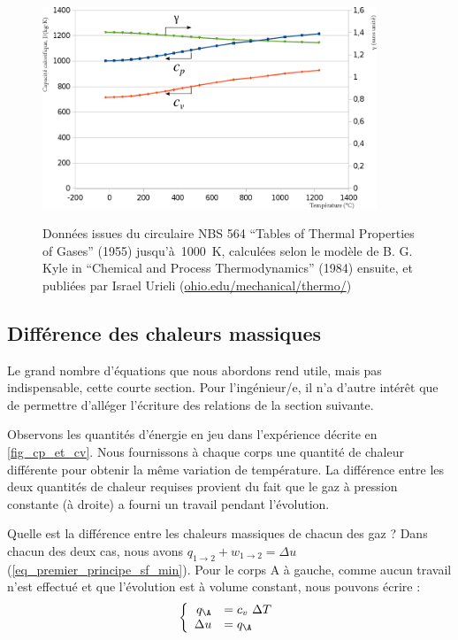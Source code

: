 		\begin{figure}[htb]
			\begin{center}
				\includegraphics[width=10cm]{images/valeurs_cp_cv_air.png}
			\end{center}
				{Données issues du circulaire NBS 564 “Tables of Thermal Properties of Gases” (1955) jusqu’à~\SI{1000}{\kelvin}, calculées selon le modèle de B. G. Kyle in “Chemical and Process Thermodynamics” (1984) ensuite, et publiées par Israel Urieli (\href{http ://www.ohio.edu/mechanical/thermo/}{ohio.edu/mechanical/thermo/})}
		\label{fig_valeurs_de_cp_cv_gamma}
		\end{figure}



	\subsection{Différence des chaleurs massiques}

		Le grand nombre d’équations que nous abordons rend utile, mais pas indispensable, cette courte section. Pour l’ingénieur/e, il n’a d’autre intérêt que de permettre d’alléger l’écriture des relations de la section suivante.

		Observons les quantités d’énergie en jeu dans l’expérience décrite en \cref{fig_cp_et_cv}. Nous fournissons à chaque corps une quantité de chaleur différente pour obtenir la même variation de température. La différence entre les deux quantités de chaleur requises provient du fait que le gaz à pression constante (à droite) a fourni un travail pendant l’évolution.

		Quelle est la différence entre les chaleurs massiques de chacun des gaz ? Dans chacun des deux cas, nous avons $q_{1 \to 2} + w_{1 \to 2} = \Delta u$ (\ref{eq_premier_principe_sf_min}). Pour le corps A à gauche, comme aucun travail n’est effectué et que l’évolution est à volume constant, nous pouvons écrire :
			\begin{equation}
				\left\{
					\begin{array}{rl}
						q_\A 		& = c_v \ \Delta T \\
						\Delta u 			& = q_\A
					\end{array} \right.
			\label{eq_sectionmathschiante_0}
			\end{equation}

